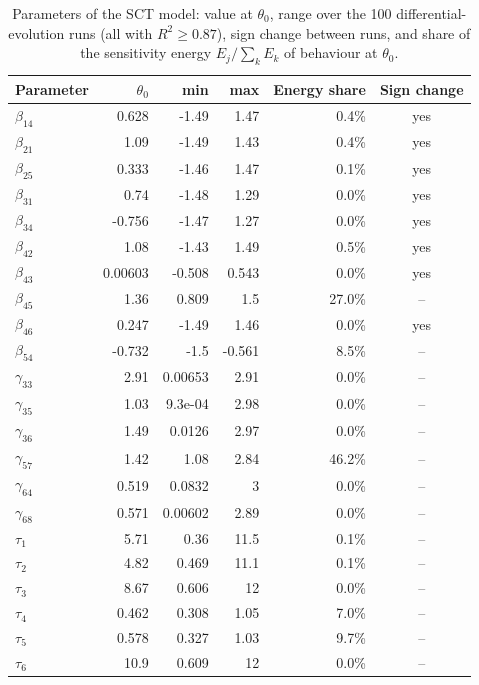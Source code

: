 {\small
\begin{longtable}{@{}lrrrrc@{}}
\caption{Parameters of the SCT model: value at $\theta_0$, range over the 100 differential-evolution runs (all with $R^2\ge0.87$), sign change between runs, and share of the sensitivity energy $E_j/\sum_kE_k$ of behaviour at $\theta_0$.}\label{tab:sct}\\
\toprule
Parameter & $\theta_0$ & min & max & Energy share & Sign change \\
\midrule
\endhead
$\beta_{14}$ & 0.628 & -1.49 & 1.47 & 0.4\% & yes \\
$\beta_{21}$ & 1.09 & -1.49 & 1.43 & 0.4\% & yes \\
$\beta_{25}$ & 0.333 & -1.46 & 1.47 & 0.1\% & yes \\
$\beta_{31}$ & 0.74 & -1.48 & 1.29 & 0.0\% & yes \\
$\beta_{34}$ & -0.756 & -1.47 & 1.27 & 0.0\% & yes \\
$\beta_{42}$ & 1.08 & -1.43 & 1.49 & 0.5\% & yes \\
$\beta_{43}$ & 0.00603 & -0.508 & 0.543 & 0.0\% & yes \\
$\beta_{45}$ & 1.36 & 0.809 & 1.5 & 27.0\% & -- \\
$\beta_{46}$ & 0.247 & -1.49 & 1.46 & 0.0\% & yes \\
$\beta_{54}$ & -0.732 & -1.5 & -0.561 & 8.5\% & -- \\
$\gamma_{33}$ & 2.91 & 0.00653 & 2.91 & 0.0\% & -- \\
$\gamma_{35}$ & 1.03 & 9.3e-04 & 2.98 & 0.0\% & -- \\
$\gamma_{36}$ & 1.49 & 0.0126 & 2.97 & 0.0\% & -- \\
$\gamma_{57}$ & 1.42 & 1.08 & 2.84 & 46.2\% & -- \\
$\gamma_{64}$ & 0.519 & 0.0832 & 3 & 0.0\% & -- \\
$\gamma_{68}$ & 0.571 & 0.00602 & 2.89 & 0.0\% & -- \\
$\tau_{1}$ & 5.71 & 0.36 & 11.5 & 0.1\% & -- \\
$\tau_{2}$ & 4.82 & 0.469 & 11.1 & 0.1\% & -- \\
$\tau_{3}$ & 8.67 & 0.606 & 12 & 0.0\% & -- \\
$\tau_{4}$ & 0.462 & 0.308 & 1.05 & 7.0\% & -- \\
$\tau_{5}$ & 0.578 & 0.327 & 1.03 & 9.7\% & -- \\
$\tau_{6}$ & 10.9 & 0.609 & 12 & 0.0\% & -- \\
\bottomrule
\end{longtable}
}

